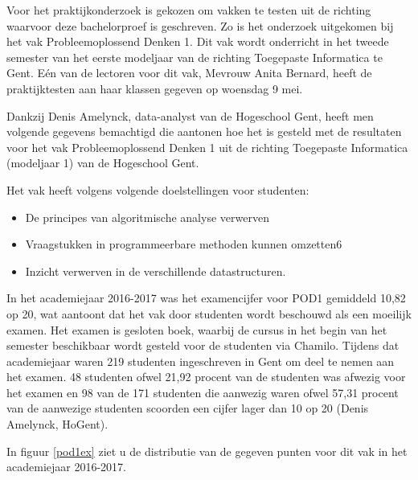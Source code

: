 Voor het praktijkonderzoek is gekozen om vakken te testen uit de richting waarvoor deze bachelorproef is geschreven. Zo is het onderzoek uitgekomen bij het vak Probleemoplossend Denken 1. Dit vak wordt onderricht in het tweede semester van het eerste modeljaar van de richting Toegepaste Informatica te Gent. Eén van de lectoren voor dit vak, Mevrouw Anita Bernard, heeft de praktijktesten aan haar klassen gegeven op woensdag 9 mei. 

Dankzij Denis Amelynck, data-analyst van de Hogeschool Gent, heeft men volgende gegevens bemachtigd die aantonen hoe het is gesteld met de resultaten voor het vak Probleemoplossend Denken 1 uit de richting Toegepaste Informatica (modeljaar 1) van de Hogeschool Gent.

Het vak heeft volgens \textcite{Studiegids2017} volgende doelstellingen voor studenten:
\begin{itemize}
	\item De principes van algoritmische analyse verwerven
	\item Vraagstukken in programmeerbare methoden kunnen omzetten6
	\item Inzicht verwerven in de verschillende datastructuren.
\end{itemize}

In het academiejaar 2016-2017 was het examencijfer voor POD1 gemiddeld 10,82 op 20, wat aantoont dat het vak door studenten wordt beschouwd als een moeilijk examen. Het examen is gesloten boek, waarbij de cursus in het begin van het semester beschikbaar wordt gesteld voor de studenten via Chamilo. Tijdens dat academiejaar waren 219 studenten ingeschreven in Gent om deel te nemen aan het examen. 48 studenten ofwel 21,92 procent van de studenten was afwezig voor het examen en 98 van de 171 studenten die aanwezig waren ofwel 57,31 procent van de aanwezige studenten scoorden een cijfer lager dan 10 op 20 (Denis Amelynck, HoGent).

In figuur \ref{pod1ex} ziet u de distributie van de gegeven punten voor dit vak in het academiejaar 2016-2017.

